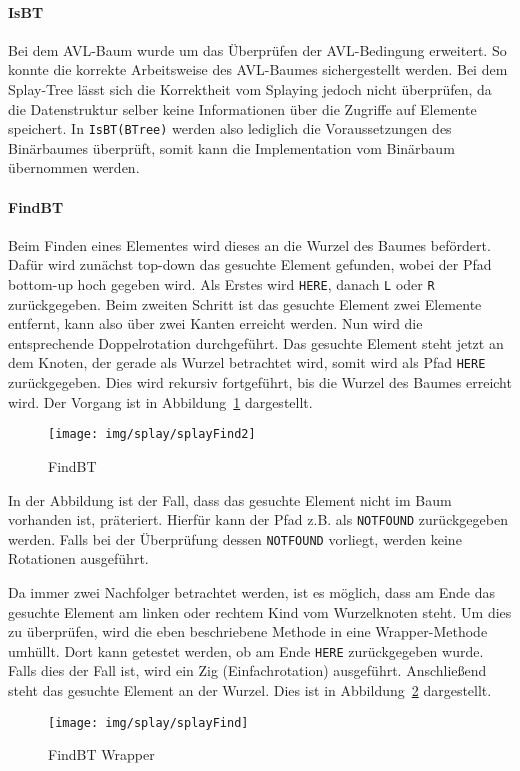 \paragraph{IsBT}
Bei dem AVL-Baum wurde  um das Überprüfen der AVL-Bedingung erweitert.
So konnte die korrekte Arbeitsweise des AVL-Baumes sichergestellt werden.
Bei dem Splay-Tree lässt sich die Korrektheit vom Splaying jedoch nicht überprüfen, da die
Datenstruktur selber keine Informationen über die Zugriffe auf Elemente speichert.
In \verb|IsBT(BTree)| werden also lediglich die Voraussetzungen des Binärbaumes überprüft,
somit kann die Implementation vom Binärbaum übernommen werden.

\paragraph{FindBT}\label{par:splay-findBT}
Beim Finden eines Elementes wird dieses an die Wurzel des Baumes befördert.
Dafür wird zunächst top-down das gesuchte Element gefunden, wobei der Pfad
bottom-up hoch gegeben wird.
Als Erstes wird \verb|HERE|, danach \verb|L| oder \verb|R| zurückgegeben.
Beim zweiten Schritt ist das gesuchte Element zwei Elemente entfernt, kann also über zwei
Kanten erreicht werden.
Nun wird die entsprechende Doppelrotation durchgeführt.
Das gesuchte Element steht jetzt an dem Knoten, der gerade als Wurzel betrachtet wird, somit wird
als Pfad \verb|HERE| zurückgegeben.
Dies wird rekursiv fortgeführt, bis die Wurzel des Baumes erreicht wird.
Der Vorgang ist in Abbildung~\ref{fig:splayFind} dargestellt.
\begin{figure}[hbt]
    \centering
    \texttt{[image: img/splay/splayFind2]}
    \caption{FindBT}
    \label{fig:splayFind}
\end{figure}

In der Abbildung ist der Fall, dass das gesuchte Element nicht im Baum vorhanden ist, präteriert.
Hierfür kann der Pfad z.B. als \verb|NOTFOUND| zurückgegeben werden.
Falls bei der Überprüfung dessen \verb|NOTFOUND| vorliegt, werden keine Rotationen ausgeführt.

Da immer zwei Nachfolger betrachtet werden, ist es möglich, dass am Ende das gesuchte Element
am linken oder rechtem Kind vom Wurzelknoten steht.
Um dies zu überprüfen, wird die eben beschriebene Methode in eine Wrapper-Methode umhüllt.
Dort kann getestet werden, ob am Ende \verb|HERE| zurückgegeben wurde.
Falls dies der Fall ist, wird ein Zig (Einfachrotation) ausgeführt.
Anschließend steht das gesuchte Element an der Wurzel.
Dies ist in Abbildung~\ref{fig:splayFind2} dargestellt.
\begin{figure}[hbt]
    \centering
    \texttt{[image: img/splay/splayFind]}
    \caption{FindBT Wrapper}
    \label{fig:splayFind2}
\end{figure}

